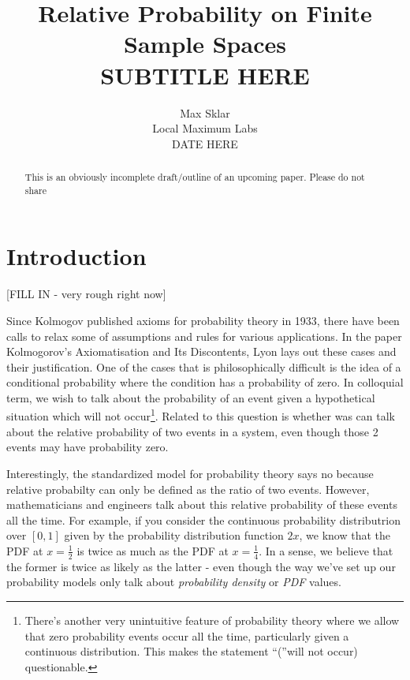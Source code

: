 \documentclass[twoside]{article}
\newcommand{\quotes}[1]{``#1''}
\begin{document}
\parindent=0in
\parskip=12pt


\title{
  Relative Probability on Finite Sample Spaces \\
  \large{
    SUBTITLE HERE
  }
}

\author{Max Sklar\\ Local Maximum Labs \\ DATE HERE}
\date{}

\maketitle
\thispagestyle{empty}

\begin{abstract}
This is an obviously incomplete draft/outline of an upcoming paper. Please do not share
\end{abstract}

\section{Introduction}

[FILL IN - very rough right now]

Since Kolmogov published axioms for probability theory in 1933, there have been calls to relax some of assumptions and rules for various applications. In the paper Kolmogorov's Axiomatisation and Its Discontents\cite{lyon}, Lyon lays out these cases and their justification. One of the cases that is philosophically difficult is the idea of a conditional probability where the condition has a probability of zero. In colloquial term, we wish to talk about the probability of an event given a hypothetical situation which will not occur\footnote{There's another very unintuitive feature of probability theory where we allow that zero probability events occur all the time, particularly given a continuous distribution. This makes the statement \quotes(will not occur) questionable.}. Related to this question is whether was can talk about the relative probability of two events in a system, even though those 2 events may have probability zero.

Interestingly, the standardized model for probability theory says no because relative probabilty can only be defined as the ratio of two events. However, mathematicians and engineers talk about this relative probability of these events all the time. For example, if you consider the continuous probability distributrion over \([0, 1]\) given by the probability distribution function \(2x\), we know that the PDF at \(x = \frac{1}{2}\) is twice as much as the PDF at \(x = \frac{1}{4}\). In a sense, we believe that the former is twice as likely as the latter - even though the way we've set up our probability models only talk about \textit{probability density} or \textit{PDF} values.
\end{document}
